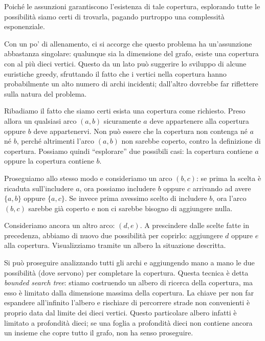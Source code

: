 \begin{solution}
Poiché le assunzioni garantiscono l'esistenza di tale copertura, esplorando tutte le possibilità siamo certi di trovarla, pagando purtroppo una complessità esponenziale.

\FPT
Con un po' di allenamento, ci si accorge che questo problema ha un'assunzione abbastanza singolare: qualunque sia la dimensione del grafo, esiste una copertura con al più dieci vertici. Questo da un lato può suggerire lo sviluppo di alcune euristiche greedy, sfruttando il fatto che i vertici nella copertura hanno probabilmente un alto numero di archi incidenti; dall'altro dovrebbe far riflettere sulla natura del problema.

Ribadiamo il fatto che siamo certi esista una copertura come richiesto. Preso allora un qualsiasi arco $(a,b)$ sicuramente $a$ deve appartenere alla copertura oppure $b$ deve appartenervi. Non può essere che la copertura non contenga né $a$ né $b$, perché altrimenti l'arco $(a,b)$ non sarebbe coperto, contro la definizione di copertura. Possiamo quindi ``esplorare'' due possibili casi: la copertura contiene $a$ oppure la copertura contiene $b$.

Proseguiamo allo stesso modo e consideriamo un arco $(b,c)$: se prima la scelta è ricaduta sull'includere $a$, ora possiamo includere $b$ oppure $c$ arrivando ad avere $\{a,b\}$ oppure $\{a,c\}$. Se invece prima avessimo scelto di includere $b$, ora l'arco $(b,c)$ sarebbe già coperto e non ci sarebbe bisogno di aggiungere nulla.

Consideriamo ancora un altro arco: $(d,e)$. A prescindere dalle scelte fatte in precedenza, abbiamo di nuovo due possibilità per coprirlo: aggiungere $d$ oppure $e$ alla copertura. Visualizziamo tramite un albero la situazione descritta.

	\begin{center}
	\end{center}

Si può proseguire analizzando tutti gli archi e aggiungendo mano a mano le due possibilità (dove servono) per completare la copertura. Questa tecnica è detta \emph{bounded search tree}: stiamo costruendo un albero di ricerca della copertura, ma esso è limitato dalla dimensione massima della copertura. La chiave per non far espandere all'infinito l'albero e rischiare di percorrere strade non convenienti è proprio data dal limite dei dieci vertici. Questo particolare albero infatti è limitato a profondità dieci; se una foglia a profondità dieci non contiene ancora un insieme che copre tutto il grafo, non ha senso proseguire.


\end{solution}
